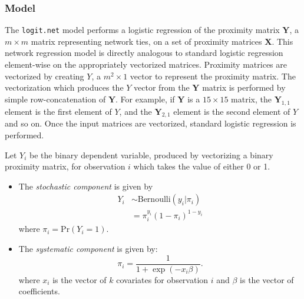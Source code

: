 


\subsubsection{Model}
The {\tt logit.net} model performs a logistic regression of the proximity matrix $\mathbf{Y}$, a $m \times m$ matrix representing network ties, on a set of proximity matrices $\mathbf{X}$. This network regression model is directly analogous to standard logistic regression element-wise on the appropriately vectorized matrices. Proximity matrices are vectorized by creating $Y$, a $m^2 \times 1$ vector to represent the proximity matrix. The vectorization which produces the $Y$ vector from the $\mathbf{Y}$ matrix is performed by simple row-concatenation of $\mathbf{Y}$. For example, if $\mathbf{Y}$ is a $15 \times 15$ matrix, the $\mathbf{Y}_{1,1}$ element is the first element of $Y$, and the $\mathbf{Y}_{2,1}$ element is the second element of $Y$ and so on. Once the input matrices are vectorized, standard logistic regression is performed. 

Let $Y_{i}$ be the binary dependent variable, produced by vectorizing a binary proximity matrix, for observation $i$ which takes the value of either 0 or 1.
\begin{itemize}
\item The \emph{stochastic component} is given by 
\begin{eqnarray*}
Y_{i} & \sim \text{Bernoulli} (y_{i} | \pi_{i})\\
& = \pi_{i}^{y_{i}} (1 - \pi_{i})^{1 - y_{i}}
\end{eqnarray*}
where $\pi_{i} = \text{Pr}(Y_{i} = 1)$.
\item The \emph{systematic component} is given by:
\begin{equation*}
\pi_{i} = \frac{1}{1 + \exp(-x_{i}\beta)}.
\end{equation*}
where $x_{i}$ is the vector of $k$ covariates for observation $i$ and $\beta$ is the vector of coefficients.
\end{itemize}


